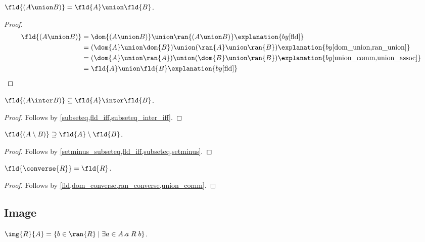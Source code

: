 \begin{proposition}\label{fld_union}
    $\fld{(A\union B)} = \fld{A}\union\fld{B}$.
\end{proposition}
\begin{proof}
    \begin{align*}
        \fld{(A\union B)}
        &= \dom{(A\union B)}\union\ran{(A\union B)}
            \explanation{by \cref{fld}}\\
        &= (\dom{A}\union\dom{B})\union(\ran{A}\union\ran{B})
            \explanation{by \cref{dom_union,ran_union}}\\
        &= (\dom{A}\union\ran{A})\union(\dom{B}\union\ran{B})
            \explanation{by \cref{union_comm,union_assoc}}\\
        &= \fld{A}\union\fld{B}
        \explanation{by \cref{fld}}
    \end{align*}
\end{proof}

\begin{proposition}\label{fld_inter}
    $\fld{(A\inter B)}\subseteq \fld{A}\inter\fld{B}$.
\end{proposition}
\begin{proof}
    Follows by \cref{subseteq,fld_iff,subseteq_inter_iff}.
\end{proof}

\begin{proposition}\label{fld_setminus}
    $\fld{(A\setminus B)}\supseteq \fld{A}\setminus\fld{B}$.
\end{proposition}
\begin{proof}
    Follows by \cref{setminus_subseteq,fld_iff,subseteq,setminus}.
\end{proof}

\begin{proposition}\label{fld_converse}
    $\fld{\converse{R}} = \fld{R}$.
\end{proposition}
\begin{proof}
    Follows by \cref{fld,dom_converse,ran_converse,union_comm}.
\end{proof}


\subsection{Image}

\begin{definition}\label{img}
    $\img{R}{A} = \{b\in\ran{R} \mid \exists a\in A. a\mathrel{R} b \}$.
\end{definition}

